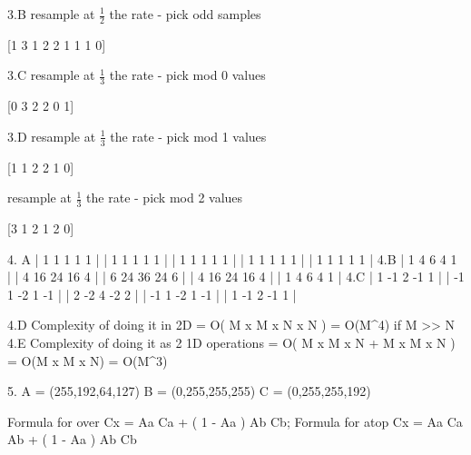 \documentclass[11pt]{article}
\begin{document}
3.B resample at $\frac{1}{2}$ the rate - pick odd samples

	[1 3 1 2 2 1 1 1 0]	

3.C resample at $\frac{1}{3}$ the rate - pick mod 0 values

	[0 3 2 2 0 1]

3.D	resample at $\frac{1}{3}$ the rate - pick mod 1 values

	[1 1 2 2 1 0]

	resample at $\frac{1}{3}$ the rate - pick mod 2 values

	[3 1 2 1 2 0]

4. A
	 	| 1 1 1 1 1 |
				| 1 1 1 1 1 |
				| 1 1 1 1 1 |
				| 1 1 1 1 1 |
				| 1 1 1 1 1 |
4.B
		| 1 4  6  4  1 |
				| 4 16 24 16 4 |
				| 6 24 36 24 6 |
				| 4 16 24 16 4 |
				| 1 4  6  4  1 |
4.C
			|  1 -1  2 -1  1 |
				| -1  1 -2  1 -1 |
				|  2 -2  4 -2  2 |
				| -1  1 -2  1 -1 |
				|  1 -1  2 -1  1 |

4.D Complexity of doing it in 2D
	= O( M x M x N x N ) = O(M^4) if M >> N
4.E Complexity of doing it as 2 1D operations
	= O( M x M x N + M x M x N  ) = O(M x M x N) = O(M^3)

5. 
	A = (255,192,64,127)
	B = (0,255,255,255)
	C = (0,255,255,192)
	
	Formula for over Cx = Aa Ca + ( 1 - Aa ) Ab Cb;
	Formula for atop Cx = Aa Ca Ab + ( 1 - Aa ) Ab Cb
\end{document}
